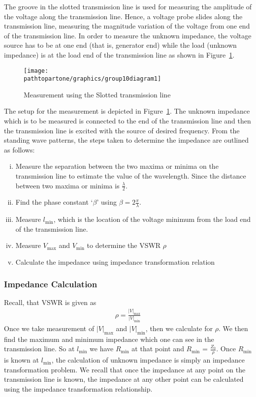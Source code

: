 The groove in the slotted transmission line is used for measuring the amplitude of the voltage along the transmission line. Hence, a voltage probe slides along the transmission line, measuring the magnitude variation of the voltage from one end of the transmission line. In order to measure the unknown impedance, the voltage source has to be at one end (that is, generator end) while the load (unknown impedance) is at the load end of the transmission line as shown in Figure~\ref{fig:group10diagram1}.
\begin{figure}[h]
\centering
\texttt{[image: \\pathtopartone/graphics/group10diagram1]}
\caption{Measurement using the Slotted transmission line}
\label{fig:group10diagram1}
\end{figure}

The setup for the measurement is depicted in Figure~\ref{fig:group10diagram1}. The unknown impedance which is to be measured is connected to the end of the transmission line and then the transmission line is excited with the source of desired frequency. From the standing wave patterns, the steps taken to determine the impedance are outlined as follows:
\begin{enumerate}[(i)]
\item Measure the separation between the two maxima or minima on the transmission line to estimate the value of the wavelength. Since the distance between two maxima or minima is $\frac{\lambda}{2}$.
\item Find the phase constant `$\beta$' using $\beta = 2\frac{\pi}{\lambda}$.
\item Measure $l_\min$, which is the location of the voltage minimum from the load end of the transmission line.
\item Measure $V_\max$ and $V_\min$ to determine the VSWR $\rho$
\item Calculate the impedance using impedance transformation relation
\end{enumerate}

\subsubsection{Impedance Calculation}
Recall, that VSWR is given as
\begin{align}
\rho = \frac{|V|_\max}{|V|_\min}
\end{align}
Once we take measurement of $|V|_\max$ and $|V|_\min$, then we calculate for $ \rho $. We then find the maximum and minimum impedance which one can see in the transmission line. So at $l_\min$ we have $R_\min$ at that point and $R_\min$ = $\frac{Z_0}{\rho}$. Once $R_\min$ is known at $l_\min$, the calculation of unknown impedance is simply an impedance transformation problem. We recall that once the impedance at any point on the transmission line is known, the impedance at any other point can be calculated using the impedance transformation relationship.

